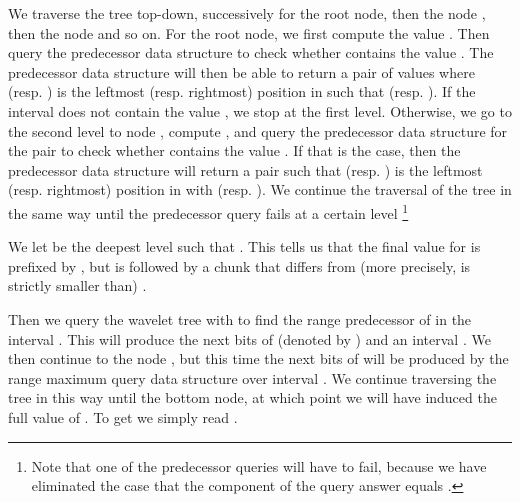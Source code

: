 \documentclass[11pt,runningheads]{llncs}
\begin{document}
{We traverse the tree top-down, successively for the root node, 
then the node , then the node 
and so on. For the root node, we first compute the value . 
Then query the predecessor data structure  to check whether 
 contains the value . The predecessor data structure will then be able to return 
a pair of values  where  (resp. ) 
is the leftmost (resp. rightmost) position in  such that  
(resp. ). If the interval  does not contain the value , 
we stop at the first level. Otherwise, we go to the second level to node , compute , and query the predecessor 
data structure  for the pair 
 to check whether 
contains the value . If that is the case, then
the predecessor data structure will return a pair  such 
that  (resp. ) is the leftmost (resp. rightmost) position 
in  with  
(resp. ). 
We continue the traversal of the tree in the same way until the  
predecessor query fails at a certain level \footnote{Note that 
one of the predecessor queries will have to fail, because we have 
eliminated the case that the  component of the query answer 
equals .} 

We let  be the deepest level such that . This tells us 
that the final value for  is prefixed by , 
but is followed by a chunk that differs from  (more precisely, is strictly smaller than) 
. 

Then we query the wavelet tree  with
 to find the range predecessor of 
in the interval . This will produce the next  bits
of  (denoted by ) and an interval . We then continue to the node 
, but this time the next bits of  will be produced 
by the range maximum query data structure over interval . 
We continue traversing the tree in this way until the bottom node,  
at which point we will have induced the full value of . To get  we simply read . 
 
}
\end{document}
